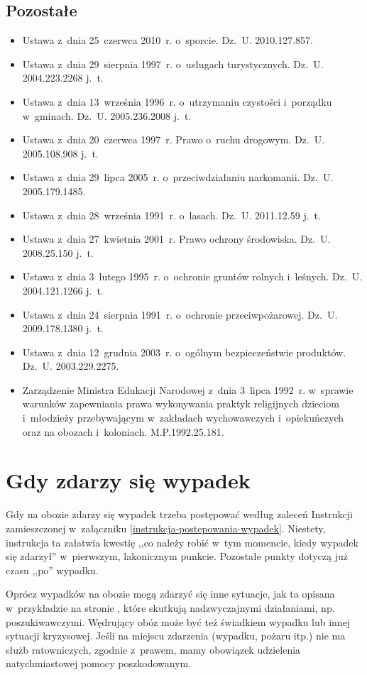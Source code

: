 \documentclass[a5paper,10pt,titlepage,twoside]{article}
\begin{document}
\subsection{Pozostałe}
\begin{itemize}
\item Ustawa z~dnia 25~czerwca 2010~r. o~sporcie. Dz.~U. 2010.127.857.
\item Ustawa z~dnia 29~sierpnia 1997~r. o~usługach turystycznych. Dz.~U. 2004.223.2268 j.~t.
\item Ustawa z~dnia 13~września 1996~r. o~utrzymaniu czystości i~porządku w~gminach. Dz.~U. 2005.236.2008 j.~t.
\item Ustawa z~dnia 20~czerwca 1997~r. Prawo o~ruchu drogowym. Dz.~U. 2005.108.908 j.~t.
\item Ustawa z~dnia 29~lipca 2005~r. o~przeciwdziałaniu narkomanii. Dz.~U. 2005.179.1485.
\item Ustawa z~dnia 28~września 1991~r. o~lasach. Dz.~U. 2011.12.59 j.~t.
\item Ustawa z~dnia 27~kwietnia 2001~r. Prawo ochrony środowiska. Dz.~U. 2008.25.150 j.~t.
\item Ustawa z~dnia 3~lutego 1995~r. o~ochronie gruntów rolnych i~leśnych. Dz.~U. 2004.121.1266 j.~t.
\item Ustawa z~dnia 24~sierpnia 1991~r. o~ochronie przeciwpożarowej. Dz.~U. 2009.178.1380 j.~t.
\item Ustawa z~dnia 12~grudnia 2003~r. o~ogólnym bezpieczeństwie produktów. Dz.~U. 2003.229.2275.
\item Zarządzenie Ministra Edukacji Narodowej z~dnia 3~lipca 1992~r. w~sprawie warunków zapewniania prawa wykonywania praktyk religijnych dzieciom i~młodzieży przebywającym w~zakładach wychowawczych i~opiekuńczych oraz na obozach i~koloniach. M.P.1992.25.181.
\end{itemize}
\cleardoublepage
\section{Gdy zdarzy się wypadek}
Gdy na obozie zdarzy się wypadek trzeba postępować według zaleceń Instrukcji zamieszczonej w~załączniku \ref{instrukcja-postepowania-wypadek}.
Niestety, instrukcja ta załatwia kwestię ,,co należy robić w~tym momencie, kiedy wypadek się zdarzył'' w~pierwszym, lakonicznym punkcie. Pozostałe punkty dotyczą już czasu ,,po'' wypadku.

Oprócz wypadków na obozie mogą zdarzyć się inne sytuacje, jak ta opisana w~przykładzie na stronie \pageref{akcja-kroscienko-szczawnica}, które skutkują nadzwyczajnymi działaniami, np. poszukiwawczymi. Wędrujący obóz może być też świadkiem wypadku lub innej sytuacji kryzysowej. Jeśli na miejscu zdarzenia (wypadku, pożaru itp.) nie ma służb ratowniczych, zgodnie z~prawem, mamy obowiązek udzielenia natychmiastowej pomocy poszkodowanym.
\end{document}
